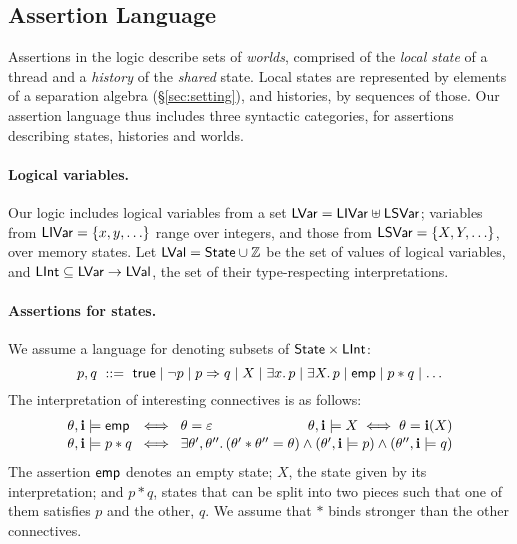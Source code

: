

\subsection{Assertion Language}\label{sec:asslang}

Assertions in the logic describe sets of \emph{worlds}, comprised of the
\emph{local state} of a thread and a \emph{history} of the \emph{shared}
  state. Local states are represented by elements of a separation
algebra (\S\ref{sec:setting}), and histories, by sequences of those. Our
assertion language thus includes three syntactic categories, for
assertions describing states, histories and worlds.  


\paragraph{Logical variables.}
Our logic includes logical variables from a set ${\sf LVar} = {\sf LIVar} \uplus {\sf LSVar}$;
variables from ${\sf LIVar} = \{x, y, \ldots\}$ range over integers, and those
from ${\sf LSVar} = \{X, Y, \ldots\}$, over memory states. 
Let ${\sf LVal} = {\sf State} \cup
\mathbb{Z}$ be the set of values of logical variables, and ${\sf LInt} \subseteq {\sf LVar} \to
{\sf LVal}$, the set of their type-respecting interpretations. %

\paragraph{Assertions for states.}  We assume a language for denoting subsets of
${\sf State} \times {\sf LInt}$:%
$$
p,q 
\ ::=\  \mathsf{true} \mid \neg p \mid p \Rightarrow q  \mid X \mid 
\exists x.\, p \mid \exists X.\, p \mid\mathsf{emp} \mid p * q \mid \ldots
$$ 
The interpretation of interesting connectives is as follows:
$$
\begin{array}{@{}l@{\;\;}c@{\;\;}l@{}}
\theta, \intp \models \emp 
& \iff &
\theta = \varepsilon
\hfill \qquad\qquad
\theta, \intp \models X \iff
\theta = \intp(X)
\\[1pt]
\theta, \intp \models p * q 
& \iff &
\exists \theta',\theta''.\,
(\theta' * \theta'' = \theta)
\wedge
(\theta',\intp \models p)
\wedge
(\theta'',\intp \models q)
\end{array}
$$
The assertion $\mathsf{emp}$ denotes an empty state; $X$, the state given by its
interpretation; and $p*q$, states that can be split into two pieces such that
one of them satisfies $p$ and the other, $q$. We assume that $*$ binds stronger
than the other connectives.

